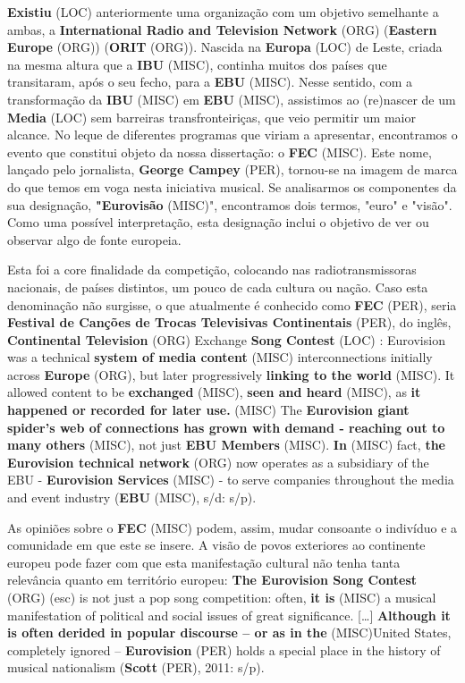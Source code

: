 \documentclass[12pt,a4paper]{article}
\begin{document}
\textbf{Existiu} (LOC) anteriormente uma organização com um objetivo semelhante a ambas, a \textbf{International Radio and Television Network} (ORG) (\textbf{Eastern Europe} (ORG)) (\textbf{ORIT} (ORG)). Nascida na \textbf{Europa} (LOC) de Leste, criada na mesma altura que a \textbf{IBU} (MISC), continha muitos dos países que transitaram, após  o  seu  fecho,  para  a  \textbf{EBU} (MISC).  Nesse  sentido,  com  a  transformação  da  \textbf{IBU} (MISC)  em  \textbf{EBU} (MISC), assistimos ao (re)nascer de um \textbf{Media} (LOC) sem barreiras transfronteiriças, que veio permitir um  maior  alcance.  No  leque  de  diferentes  programas  que  viriam  a  apresentar, encontramos  o  evento  que  constitui  objeto  da  nossa  dissertação:  o  \textbf{FEC} (MISC).  Este  nome, lançado pelo jornalista, \textbf{George Campey} (PER), tornou-se na imagem de marca  do que temos em  voga  nesta  iniciativa  musical.  Se  analisarmos  os  componentes  da  sua  designação, \textbf{"Eurovisão} (MISC)",  encontramos  dois  termos,  "euro"  e  "visão".  Como  uma  possível interpretação, esta designação inclui o objetivo de ver ou observar algo de fonte europeia.

Esta foi a core finalidade da competição, colocando nas radiotransmissoras nacionais, de países distintos, um pouco de cada cultura ou nação. Caso esta denominação não surgisse, o que atualmente é conhecido como \textbf{FEC} (PER), seria \textbf{Festival de Canções de Trocas Televisivas Continentais} (PER), do inglês, \textbf{Continental Television} (ORG) Exchange \textbf{Song Contest} (LOC) : Eurovision  was  a  technical  \textbf{system  of  media  content} (MISC)  interconnections  initially  across \textbf{Europe} (ORG), but later progressively \textbf{linking to the world} (MISC). It allowed content to be \textbf{exchanged} (MISC), \textbf{seen and heard} (MISC), as \textbf{it happened or recorded for later use.} (MISC) The \textbf{Eurovision giant spider's web of connections has grown with demand - reaching out to many others} (MISC), not just \textbf{EBU Members} (MISC). \textbf{In} (MISC) fact, \textbf{the Eurovision technical network} (ORG) now operates as a subsidiary of the EBU - \textbf{Eurovision Services} (MISC) - to serve companies throughout the media and event industry (\textbf{EBU} (MISC), s/d: s/p).

As  opiniões  sobre  o  \textbf{FEC} (MISC)  podem,  assim,  mudar  consoante  o  indivíduo  e  a comunidade em  que  este se  insere. A visão de povos exteriores  ao continente europeu pode  fazer  com  que  esta  manifestação  cultural  não  tenha  tanta  relevância  quanto  em território europeu: \textbf{The Eurovision Song Contest} (ORG) (esc) is not just a pop song competition: often, \textbf{it is} (MISC) a musical manifestation of political and social issues of great significance. […]  \textbf{Although it is often derided  in  popular  discourse -- or  as  in  the} (MISC)United  States,  completely  ignored -- \textbf{Eurovision} (PER) holds a special place in the history of musical nationalism (\textbf{Scott} (PER), 2011: s/p).
\end{document}
